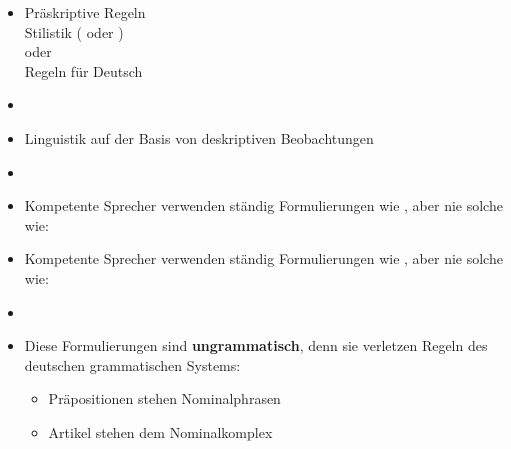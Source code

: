 \begin{frame}

\begin{itemize}
	\item Präskriptive Regeln \\
	\ras Stilistik ( oder )\\
	oder\\
	\ras Regeln für  Deutsch
	\item[]
	
	\item Linguistik \ras auf der Basis von deskriptiven Beobachtungen
	\item[]
	\item Kompetente Sprecher verwenden ständig Formulierungen wie , aber nie solche wie:
	
	\z
	
	\z
	
	\z
	
\end{itemize}

\end{frame}


\begin{frame}

\begin{itemize}
	\item Kompetente Sprecher verwenden ständig Formulierungen wie , aber nie solche wie:

	\z
	
	\z
	
	\z
	
	\item[]
	
	\item Diese Formulierungen sind \textbf{ungrammatisch}, denn sie verletzen Regeln des deutschen grammatischen Systems:
	\begin{itemize}
		\item Präpositionen stehen  Nominalphrasen
		\item Artikel stehen  dem Nominalkomplex
	\end{itemize}	 
\end{itemize}

\end{frame}


